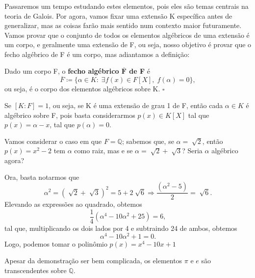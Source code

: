 \documentclass[../algebraIII_notes.tex]{subfiles}
\begin{document}
Passaremos um tempo estudando estes elementos, pois eles são temas centrais na teoria de Galois. Por agora, vamos fixar uma extensão K específica antes de generalizar, mas as coisas farão mais sentido num contexto maior futuramente.
Vamos provar que o conjunto de todos os elementos algébricos de uma extensão é um corpo, e geralmente uma extensão de F, ou seja, nosso objetivo é provar que o fecho algébrico de F é um corpo, mas adiantamos a definição:
\begin{def*}
	Dado um corpo F, o \textbf{fecho algébrico \(\mathbf{\overline{F}}\) de F} é
	\[
		\overline{F}\coloneqq \{\alpha \in K:\; \exists f(x) \in F[X],\; f(\alpha )=0\},
	\]
	ou seja, é o corpo dos elementos algébricos sobre K. \(\square\)
\end{def*}
\begin{example}
	Se \([K:F]=1\), ou seja, se K é uma extensão de grau 1 de F, então cada \(\alpha \in K\) é algébrico sobre F, pois basta considerarmos \(p(x)\in K[X]\) tal que \(p(x)=\alpha -x\), tal que \(p(\alpha )=0.\)
\end{example}
\begin{example}
	Vamos considerar o caso em que \(F = \mathbb{Q}\); sabemos que, se \(\alpha =\sqrt[]{2}\), então \(p(x)=x^{2}-2\) tem \(\alpha \) como raiz, mas e se \(\alpha =\sqrt[]{2}+\sqrt[]{3}\)? Seria \(\alpha \) algébrico agora?

	Ora, basta notarmos que
	\[
		\alpha^{2}=(\sqrt[]{2}+\sqrt[]{3})^{2} = 5 + 2\sqrt[]{6} \Rightarrow \frac{(\alpha^{2}-5)}{2}=\sqrt[]{6}.
	\]
	Elevando as expressões ao quadrado, obtemos
	\[
		\frac{1}{4}(\alpha^{4}- 10\alpha^{2} + 25) = 6,
	\]
	tal que, multiplicando os dois lados por 4 e subtraindo 24 de ambos, obtemos
	\[
		\alpha^{4}-10\alpha^{2}+1 = 0.
	\]
	Logo, podemos tomar o polinômio \(p(x)=x^{4}-10x +1\)
\end{example}
\begin{example}
	Apesar da demonstração ser bem complicada, os elementos \(\pi \) e \(e\) são transcendentes sobre \(\mathbb{Q}\).
\end{example}
\end{document}
